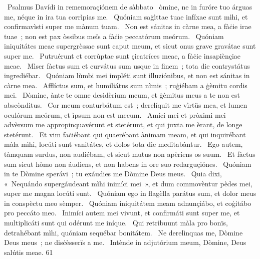 {~Psalmus Davídi in rememoraçiónem de sàbbato}
{%
~òmine, ne in furóre tuo árguas me, néque in ira tua corrìpias me.
~Quóniam saġìttae tuae infíxae sunt mìhi, et confirmavìsti super me mànum tuam.
~Non est sánitas in càrne mea, a fàċie irae tuae~; non est pax òssibus meïs a fàċie peccatórum meórum.
~Quóniam iniquitátes meae supergrèssae sunt caput meum, et sicut onus grave gravátae sunt super me.
~Putruérunt et corrùptae sunt çicatríces meae, a fàċie insapiènçiae meae.
~Mìser fàctus sum et curvátus sum usque in finem~; tota die contrystátus ingrediébar.
~Quóniam lùmbi mei impléti sunt illuziónibus, et non est sánitas in càrne mea.
~Afflíctus sum, et humiliátus sum nìmis~; ruġiébam a ġèmitu cordis mei.
~Dòmine, ànte te omne desidèrium meum, et ġèmitus meus a te non est abscònditus.
~Cor meum conturbátum est~; derelíquit me vìrtüs mea, et lumen oculórum meórum, et ìpsum non est mecum.
~Amíci mei et pròximi mei advèrsum me appropinquavérunt et stetérunt, et qui juxta me èrant, de longe stetérunt.
~Et vim faċiébant qui quaerébant ànimam meam, et qui inquirébant màla mìhi, locúti sunt vanitátes, et dolos tota die meditabàntur.
~Ego autem, tàmquam surdus, non audiébam, et sicut mutus non apèriens os suum.
~Et fàctus sum sicut hòmo non áudiens, et non habens in ore suo redarguçiónes.
~Quóniam in te Dòmine sperávi~; tu exáudies me Dòmine Deus meus.
~Quia dixi, «~Nequándo supergáudeant mìhi inimíci mei~», et dum commovèntur pèdes mei, super me magna locúti sunt.
~Quóniam ego in flagèlla parátus sum, et dolor meus in conspèctu meo sèmper.
~Quóniam iniquitátem meam adnunçiábo, et coġitábo pro peccáto meo.
~Inimíci autem mei vivunt, et confirmáti sunt super me, et multiplicáti sunt qui odérunt me iníque.
~Qui retrìbuunt màla pro bonïs, detrahébant mìhi, quóniam sequébar bonitátem.
~Ne derelìnquas me, Dòmine Deus meus~; ne disċèsserïs a me.
~Intènde in adjutórium meum, Dòmine, Deus salútis meae.}
{6}{1}
